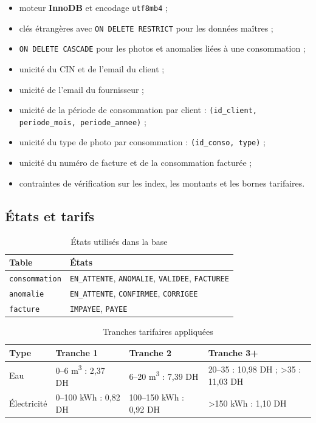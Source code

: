 \begin{itemize}[leftmargin=*]
  \item moteur \textbf{InnoDB} et encodage \texttt{utf8mb4} ;
  \item clés étrangères avec \texttt{ON DELETE RESTRICT} pour les données maîtres ;
  \item \texttt{ON DELETE CASCADE} pour les photos et anomalies liées à une consommation ;
  \item unicité du CIN et de l'email du client ;
  \item unicité de l'email du fournisseur ;
  \item unicité de la période de consommation par client : \texttt{(id\_client, periode\_mois, periode\_annee)} ;
  \item unicité du type de photo par consommation : \texttt{(id\_conso, type)} ;
  \item unicité du numéro de facture et de la consommation facturée ;
  \item contraintes de vérification sur les index, les montants et les bornes tarifaires.
\end{itemize}

\subsection{États et tarifs}

\begin{table}[H]
\centering
\caption{États utilisés dans la base}
\label{tab:etats}
\small
\begin{tabular}{p{}p{}}
\toprule
\textbf{Table} & \textbf{États} \\
\midrule
\texttt{consommation} & \texttt{EN\_ATTENTE}, \texttt{ANOMALIE}, \texttt{VALIDEE}, \texttt{FACTUREE} \\
\texttt{anomalie} & \texttt{EN\_ATTENTE}, \texttt{CONFIRMEE}, \texttt{CORRIGEE} \\
\texttt{facture} & \texttt{IMPAYEE}, \texttt{PAYEE} \\
\bottomrule
\end{tabular}
\end{table}

\begin{table}[H]
\centering
\caption{Tranches tarifaires appliquées}
\label{tab:tarifs}
\small
\begin{tabular}{p{}p{}p{}p{}}
\toprule
\textbf{Type} & \textbf{Tranche 1} & \textbf{Tranche 2} & \textbf{Tranche 3+} \\
\midrule
Eau & 0--6 m\textsuperscript{3} : 2,37 DH & 6--20 m\textsuperscript{3} : 7,39 DH & 20--35 : 10,98 DH ; >35 : 11,03 DH \\
Électricité & 0--100 kWh : 0,82 DH & 100--150 kWh : 0,92 DH & >150 kWh : 1,10 DH \\
\bottomrule
\end{tabular}
\end{table}

